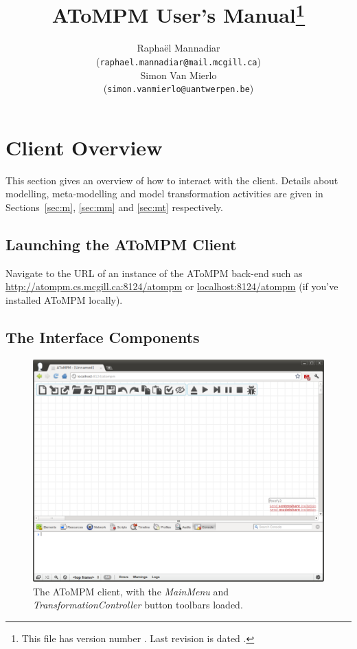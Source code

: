 \documentclass{article}
\title{\textbf{AToMPM User's Manual\footnote{This file has version number \version. Last revision is dated \versiondate.}}}
\author{Rapha\"{e}l Mannadiar\\ (\texttt{raphael.mannadiar@mail.mcgill.ca}) \\ Simon Van Mierlo\\ (\texttt{simon.vanmierlo@uantwerpen.be})}
\date{\versiondate}
\numberwithin{equation}{section}
\numberwithin{figure}{section}
\begin{document}
\parindent=0cm
\renewcommand*\arraystretch{1.5}		%

\maketitle
\thispagestyle{empty}	%
\newpage

\tableofcontents
\thispagestyle{empty}	%
\newpage


\section{Client Overview}
This section gives an overview of how to interact with the client. Details about modelling, meta-modelling and model transformation activities are given in Sections~\ref{sec:m}, \ref{sec:mm} and \ref{sec:mt} respectively.



\subsection{Launching the AToMPM Client}
Navigate to the URL of an instance of the AToMPM back-end such as \url{http://atompm.cs.mcgill.ca:8124/atompm} or \url{localhost:8124/atompm} (if you've installed AToMPM locally).



\subsection{The Interface Components}

\begin{figure}[h]
	\centering
	\includegraphics[scale=0.4]{figures/atompm}
	\caption{The AToMPM client, with the \textit{MainMenu} and \textit{TransformationController} button toolbars loaded.}
	\label{fig:atompm}
\end{figure}
\end{document}
